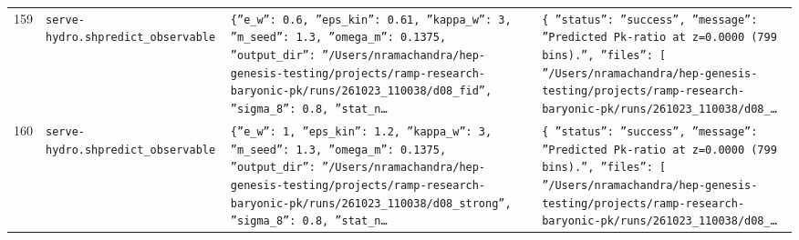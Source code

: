 \documentclass[11pt,a4paper]{article}
\begin{document}
\begin{longtable}{@{}p{}p{}p{}p{}@{}}
159 & \texttt{serve-hydro.sh}\newline\texttt{predict\_\allowbreak{}observable} & \texttt{\{''e\_\allowbreak{}w'':\allowbreak{} 0.6,\allowbreak{} ''eps\_\allowbreak{}kin'':\allowbreak{} 0.61,\allowbreak{} ''kappa\_\allowbreak{}w'':\allowbreak{} 3,\allowbreak{} ''m\_\allowbreak{}seed'':\allowbreak{} 1.3,\allowbreak{} ''omega\_\allowbreak{}m'':\allowbreak{} 0.1375,\allowbreak{} ''output\_\allowbreak{}dir'':\allowbreak{} ''/\allowbreak{}Users/\allowbreak{}nramachandra/\allowbreak{}hep-genesis-testing/\allowbreak{}projects/\allowbreak{}ramp-research-baryonic-pk/\allowbreak{}runs/\allowbreak{}261023\_\allowbreak{}110038/\allowbreak{}d08\_\allowbreak{}fid'',\allowbreak{} ''sigma\_\allowbreak{}8'':\allowbreak{} 0.8,\allowbreak{} ''stat\_\allowbreak{}n\ldots{}\allowbreak{}} & \texttt{\{   ''status'':\allowbreak{} ''success'',\allowbreak{}   ''message'':\allowbreak{} ''Predicted Pk-ratio at z=\allowbreak{}0.0000 (799 bins)\allowbreak{}.'',\allowbreak{}   ''files'':\allowbreak{} [     ''/\allowbreak{}Users/\allowbreak{}nramachandra/\allowbreak{}hep-genesis-testing/\allowbreak{}projects/\allowbreak{}ramp-research-baryonic-pk/\allowbreak{}runs/\allowbreak{}261023\_\allowbreak{}110038/\allowbreak{}d08\_\allowbreak{}\ldots{}\allowbreak{}} \\
160 & \texttt{serve-hydro.sh}\newline\texttt{predict\_\allowbreak{}observable} & \texttt{\{''e\_\allowbreak{}w'':\allowbreak{} 1,\allowbreak{} ''eps\_\allowbreak{}kin'':\allowbreak{} 1.2,\allowbreak{} ''kappa\_\allowbreak{}w'':\allowbreak{} 3,\allowbreak{} ''m\_\allowbreak{}seed'':\allowbreak{} 1.3,\allowbreak{} ''omega\_\allowbreak{}m'':\allowbreak{} 0.1375,\allowbreak{} ''output\_\allowbreak{}dir'':\allowbreak{} ''/\allowbreak{}Users/\allowbreak{}nramachandra/\allowbreak{}hep-genesis-testing/\allowbreak{}projects/\allowbreak{}ramp-research-baryonic-pk/\allowbreak{}runs/\allowbreak{}261023\_\allowbreak{}110038/\allowbreak{}d08\_\allowbreak{}strong'',\allowbreak{} ''sigma\_\allowbreak{}8'':\allowbreak{} 0.8,\allowbreak{} ''stat\_\allowbreak{}n\ldots{}\allowbreak{}} & \texttt{\{   ''status'':\allowbreak{} ''success'',\allowbreak{}   ''message'':\allowbreak{} ''Predicted Pk-ratio at z=\allowbreak{}0.0000 (799 bins)\allowbreak{}.'',\allowbreak{}   ''files'':\allowbreak{} [     ''/\allowbreak{}Users/\allowbreak{}nramachandra/\allowbreak{}hep-genesis-testing/\allowbreak{}projects/\allowbreak{}ramp-research-baryonic-pk/\allowbreak{}runs/\allowbreak{}261023\_\allowbreak{}110038/\allowbreak{}d08\_\allowbreak{}\ldots{}\allowbreak{}} \\

\end{longtable}
\end{document}
